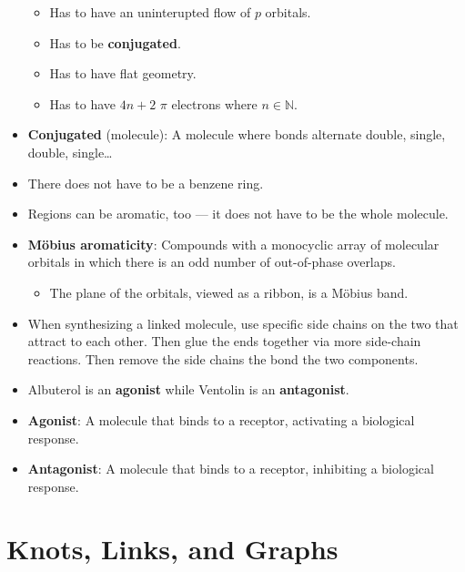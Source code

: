\documentclass[titlepage]{article}
\numberwithin{figure}{section}
\numberwithin{table}{section}
\numberwithin{equation}{section}
\begin{document}
\begin{itemize}
\begin{itemize}
        \item Has to have an uninterupted flow of $p$ orbitals.
        \item Has to be \textbf{conjugated}.
        \item Has to have flat geometry.
        \item Has to have $4n+2$ $\pi$ electrons where $n\in\mathbb{N}$.
    \end{itemize}
    \item \textbf{Conjugated} (molecule): A molecule where bonds alternate double, single, double, single\dots
    \item There does not have to be a benzene ring.
    \item Regions can be aromatic, too --- it does not have to be the whole molecule.
    \item \textbf{M\"{o}bius aromaticity}: Compounds with a monocyclic array of molecular orbitals in which there is an odd number of out-of-phase overlaps.
    \begin{itemize}
        \item The plane of the orbitals, viewed as a ribbon, is a M\"{o}bius band.
    \end{itemize}
    \item When synthesizing a linked molecule, use specific side chains on the two that attract to each other. Then glue the ends together via more side-chain reactions. Then remove the side chains the bond the two components.
    \item Albuterol is an \textbf{agonist} while Ventolin is an \textbf{antagonist}.
    \item \textbf{Agonist}: A molecule that binds to a receptor, activating a biological response.
    \item \textbf{Antagonist}: A molecule that binds to a receptor, inhibiting a biological response.
\end{itemize}
\newpage



\section{Knots, Links, and Graphs}
\end{document}
